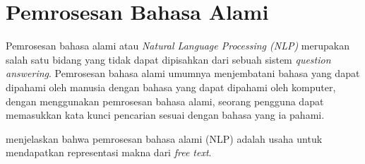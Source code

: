 \section{Pemrosesan Bahasa Alami}
Pemrosesan bahasa alami atau \emph{Natural Language Processing (NLP)} merupakan salah satu bidang yang tidak dapat dipisahkan dari sebuah sistem \emph{question answering}. Pemrosesan bahasa alami umumnya menjembatani bahasa yang dapat dipahami oleh manusia dengan bahasa yang dapat dipahami oleh komputer, dengan menggunakan pemrosesan bahasa alami, seorang pengguna dapat memasukkan kata kunci pencarian sesuai dengan bahasa yang ia pahami.

\citet*{kao_potet} menjelaskan bahwa pemrosesan bahasa alami (NLP) adalah usaha untuk mendapatkan representasi makna dari \emph{free text}.